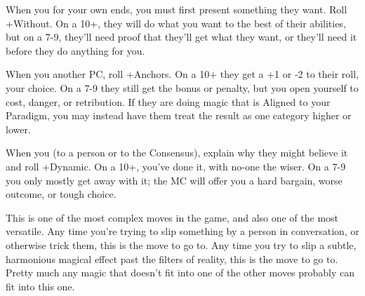 \begin{multicols}{3}
  \SEPARATOR

  \begin{move}
    When you  for your own ends, you must first
    present something they want. Roll +Without. On a 10+, they will do
    what you want to the best of their abilities, but on a 7-9,
    they'll need proof that they'll get what they want, or they'll
    need it before they do anything for you.
  \end{move}

  \SEPARATOR

  \begin{move}
    When you  another PC, roll +Anchors. On a
    10+ they get a +1 or -2 to their roll, your choice. On a 7-9 they
    still get the bonus or penalty, but you open yourself to cost,
    danger, or retribution. If they are doing magic that is Aligned to
    your Paradigm, you may instead have them treat the result as one
    category higher or lower.
  \end{move}

  \columnbreak
    
  \begin{move}
    When you  (to a person or to the Consensus),
    explain why they might believe it and roll +Dynamic. On a 10+,
    you've done it, with no-one the wiser. On a 7-9 you only mostly
    get away with it; the MC will offer you a hard bargain, worse
    outcome, or tough choice.
\begin{movedetail}
  This is one of the most complex moves in the game, and also one of
  the most versatile. Any time you're trying to slip something by a
  person in conversation, or otherwise trick them, this is the move to
  go to. Any time you try to slip a subtle, harmonious magical
  effect past the filters of reality, this is the move to go
  to. Pretty much any magic that doesn't fit into one of the other
  moves probably can fit into this one.
\end{movedetail}
  \end{move}

  \vspace{1em}
  
  \SEPARATOR


\end{multicols}
